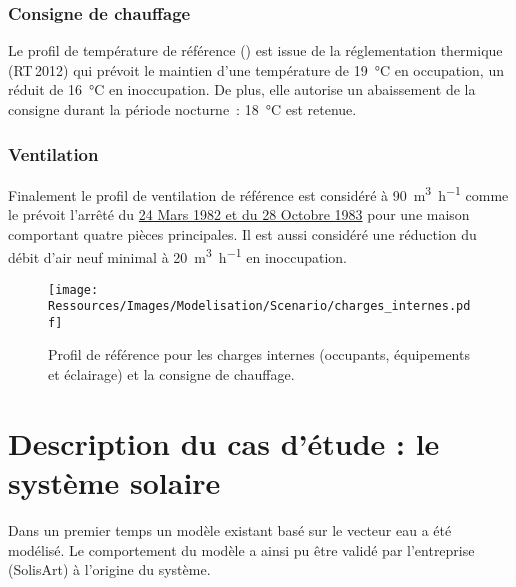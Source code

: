 \subsubsection{Consigne de chauffage} %
\label{ssub:consigne_de_chauffage}
Le profil de température de référence () est issue de la
réglementation thermique (RT\,2012) qui prévoit le maintien d’une température de
\SI{19}{\celsius} en occupation, un réduit de \SI{16}{\celsius} en inoccupation. De plus,
elle autorise un abaissement de la consigne durant la période nocturne~: \SI{18}{\celsius} est
retenue.

\subsubsection{Ventilation} %
\label{ssub:ventilation_ref}
Finalement le profil de ventilation de référence est considéré à \SI[per-mode=symbol]{90}{\meter\cubed\per\hour}
comme le prévoit l’arrêté du \href{https://www.legifrance.gouv.fr/affichTexte.do?cidTexte=JORFTEXT000000862344}{24 Mars
1982 et du 28 Octobre 1983} pour une maison comportant quatre pièces principales. Il est aussi
considéré une réduction du débit d’air neuf minimal à \SI[per-mode=symbol]{20}{\meter\cubed\per\hour}
en inoccupation.

\begin{figure}
    \centering
    \texttt{[image: Ressources/Images/Modelisation/Scenario/charges\_internes.pdf]}
    \caption{Profil de référence pour les charges internes (occupants, équipements et éclairage)
             et la consigne de chauffage.
             \label{fig:scenario_reference}}
\end{figure}




\section{Description du cas d’étude : le système solaire} %
\label{sec:description_du_cas_d_etude_le_systeme_solaire}
Dans un premier temps un modèle existant basé sur le vecteur eau a été modélisé.
Le comportement du modèle a ainsi pu être validé par l’entreprise (SolisArt) à
l’origine du système.

